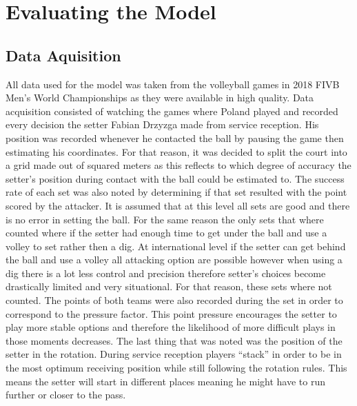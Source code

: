 \documentclass[main.tex]{subfiles}
\begin{document}
  \section{Evaluating the Model}
    \subsection{Data Aquisition}
      All data used for the model was taken from the volleyball games in 2018 FIVB Men’s World Championships as they were available in high quality. Data acquisition consisted of watching the games where Poland played and recorded every decision the setter Fabian Drzyzga made from service reception. His position was recorded whenever he contacted the ball by pausing the game then estimating his coordinates.  For that reason, it was decided to split the court into a grid made out of squared meters as this reflects to which degree of accuracy the setter’s position during contact with the ball could be estimated to. The success rate of each set was also noted by determining if that set resulted with the point scored by the attacker. It is assumed that at this level all sets are good and there is no error in setting the ball. For the same reason the only sets that where counted where if the setter had enough time to get under the ball and use a volley to set rather then a dig. At international level if the setter can get behind the ball and use a volley all attacking option are possible however when using a dig there is a lot less control and precision therefore setter’s choices become drastically limited and very situational. For that reason, these sets where not counted. The points of both teams were also recorded during the set in order to correspond to the pressure factor. This point pressure encourages the setter to play more stable options and therefore the likelihood of more difficult plays in those moments decreases. The last thing that was noted was the position of the setter in the rotation. During service reception players “stack” in order to be in the most optimum receiving position while still following the rotation rules. This means the setter will start in different places meaning he might have to run further or closer to the pass.
\end{document}
